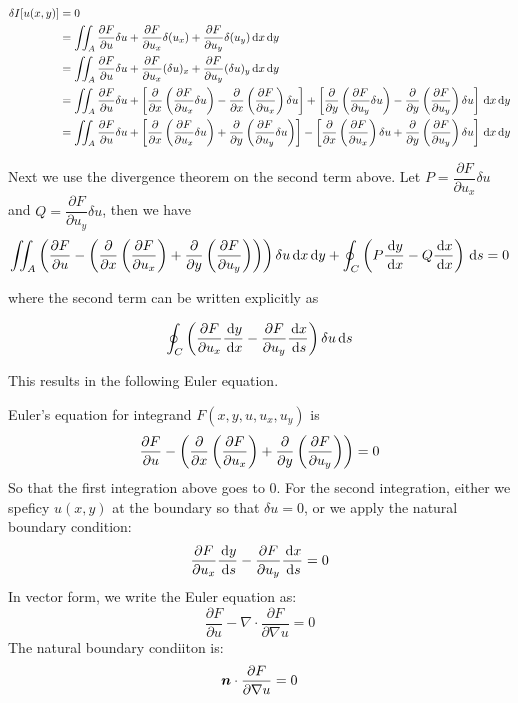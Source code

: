 \documentclass{article}
\begin{document}
\begin{align*}
    \delta I[u(x,y)] &= 0\\
    &=\iint_A \frac{\partial F}{\partial u}\delta u+\frac{\partial F}{\partial u_x}\delta (u_x) +\frac{\partial F}{\partial u_y}\delta (u_y) \,\mathrm{d} x\,\mathrm{d} y\\
    &=\iint_A \frac{\partial F}{\partial u}\delta u+\frac{\partial F}{\partial u_x}(\delta u)_x +\frac{\partial F}{\partial u_y}(\delta u)_y \,\mathrm{d} x\,\mathrm{d} y\\
    &=\iint_A \frac{\partial F}{\partial u}\delta u+ \left[ \frac{\partial }{\partial x}\left( \frac{\partial F}{\partial u_x}\delta u \right)-\frac{\partial}{\partial x}\left( \frac{\partial F}{\partial u_x} \right)\delta u \right] +\left[ \frac{\partial }{\partial y}\left( \frac{\partial F}{\partial u_y}\delta u \right)-\frac{\partial}{\partial y}\left( \frac{\partial F}{\partial u_y} \right)\delta u \right]  \,\mathrm{d} x\,\mathrm{d} y\\
    &=\iint_A \frac{\partial F}{\partial u}\delta u+ \left[ \frac{\partial }{\partial x}\left( \frac{\partial F}{\partial u_x}\delta u \right)+\frac{\partial }{\partial y}\left( \frac{\partial F}{\partial u_y}\delta u \right) \right] -\left[ \frac{\partial}{\partial x}\left( \frac{\partial F}{\partial u_x} \right)\delta u+\frac{\partial}{\partial y}\left( \frac{\partial F}{\partial u_y} \right)\delta u \right]  \,\mathrm{d} x\,\mathrm{d} y\\
\end{align*}

Next we use the divergence theorem on the second term above. Let \(P=\dfrac{\partial F}{\partial u_x}\delta u\) and \(Q=\dfrac{\partial F}{\partial u_y}\delta u\), then we have
\[\iint_A \left( \frac{\partial F}{\partial u} -\left( \frac{\partial}{\partial x}\left( \frac{\partial F}{\partial u_x} \right)+\frac{\partial}{\partial y}\left( \frac{\partial F}{\partial u_y} \right) \right)  \right)\delta u \,\mathrm{d} x\,\mathrm{d} y +\oint_C \left( P\frac{\,\mathrm{d} y}{\,\mathrm{d} x}-Q\frac{\,\mathrm{d} x}{\,\mathrm{d} x} \right)\,\mathrm{d} s=0 \]

where the second term can be written explicitly as 

\[\oint_C \left( \frac{\partial F}{\partial u_x}\frac{\,\mathrm{d} y}{\,\mathrm{d} x}-\frac{\partial F}{\partial u_y}\frac{\,\mathrm{d} x }{\,\mathrm{d} s} \right)\delta u\,\mathrm{d} s\]

This results in the following Euler equation.

\begin{theorem}
    Euler's equation for integrand \(F(x,y,u,u_x,u_y)\) is
    \[\frac{\partial F}{\partial u} -\left( \frac{\partial}{\partial x}\left( \frac{\partial F}{\partial u_x} \right)+\frac{\partial}{\partial y}\left( \frac{\partial F}{\partial u_y} \right) \right) =0\]
    So that the first integration above goes to \(0\). For the second integration, either we speficy \(u(x,y)\) at the boundary so that \(\delta u=0\), or we apply the natural boundary condition:
    \[\frac{\partial F}{\partial u_x}\frac{\,\mathrm{d} y}{\,\mathrm{d} s}-\frac{\partial F}{\partial u_y}\frac{\,\mathrm{d} x}{\,\mathrm{d} s}=0\]
    In vector form, we write the Euler equation as:
    \[\frac{\partial F}{\partial u}-\nabla\cdot \frac{\partial F}{\partial \nabla u}=0\]
    The natural boundary condiiton is:
    \[\boldsymbol{n}\cdot \frac{\partial F}{\partial\nabla u}=0\]
\end{theorem}
\end{document}
